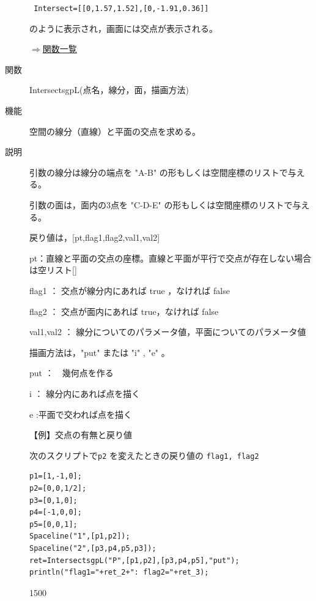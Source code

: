 \documentclass[papersize,a4paper,12pt,uplatex]{jsarticle}
\begin{document}
\begin{description}
\verb| Intersect=[[0,1.57,1.52],[0,-1.91,0.36]] |

のように表示され，画面には交点が表示される。


\begin{flushright} \hyperlink{functionlist}{$\Rightarrow$関数一覧}\end{flushright}

\vspace{\baselineskip}
\hypertarget{intersectsgpL}{}
\item[関数]IntersectsgpL(点名，線分，面，描画方法)
\item[機能]空間の線分（直線）と平面の交点を求める。
\item[説明]引数の線分は線分の端点を "A-B" の形もしくは空間座標のリストで与える。

引数の面は，面内の3点を "C-D-E" の形もしくは空間座標のリストで与える。

戻り値は，[pt,flag1,flag2,val1,val2]

pt：直線と平面の交点の座標。直線と平面が平行で交点が存在しない場合は空リスト[]

flag1 ： 交点が線分内にあれば true ，なければ false

flag2 ： 交点が面内にあれば true，なければ false

val1,val2 ： 線分についてのパラメータ値，平面についてのパラメータ値

描画方法は，"put" または "i" , "e" 。

\hspace{10mm} put ：　幾何点を作る

\hspace{10mm} i ： 線分内にあれば点を描く

\hspace{10mm} e :平面で交われば点を描く

\vspace{\baselineskip}
【例】交点の有無と戻り値

次のスクリプトで\verb|p2| を変えたときの戻り値の \verb|flag1, flag2|

\begin{verbatim}
p1=[1,-1,0];
p2=[0,0,1/2];
p3=[0,1,0];
p4=[-1,0,0];
p5=[0,0,1];
Spaceline("1",[p1,p2]);
Spaceline("2",[p3,p4,p5,p3]);
ret=IntersectsgpL("P",[p1,p2],[p3,p4,p5],"put");
println("flag1="+ret_2+": flag2="+ret_3);
\end{verbatim}

\begin{layer}{150}{0}
\end{layer}


\end{description}
\end{document}
